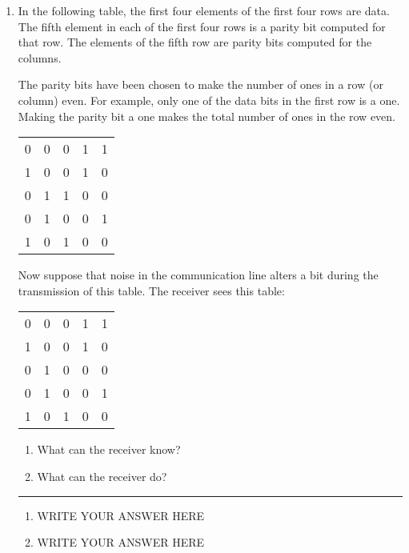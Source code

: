 \documentclass[twoside]{article}
\newenvironment{answer}
  {\vspace*{0.2cm} \rule{12cm}{0.04cm} \vspace*{0.2cm}}
  {\vspace*{0.2cm}}
\begin{document}
\begin{enumerate}
\begin{answer}
    \end{answer}

  \item In the following table, the first four elements of the
    first four rows are data. The fifth element in each of the 
    first four rows is a parity bit computed for that row.
    The elements of the fifth row are parity bits computed
    for the columns.

    The parity bits have been chosen to make the number of
    ones in a row (or column) even.
    For example, only one of the data bits in the first row
    is a one. Making the parity bit a one makes the total
    number of ones in the row even.

  \begin{tabular}{llll|l}
    0 & 0 & 0 & 1 & 1 \\
    1 & 0 & 0 & 1 & 0 \\
    0 & 1 & 1 & 0 & 0 \\
    0 & 1 & 0 & 0 & 1 \\ \hline
    1 & 0 & 1 & 0 & 0
    \end{tabular}

    Now suppose that noise in the communication line
    alters a bit during the transmission of this table.
    The receiver sees this table:

  \begin{tabular}{llll|l}
    0 & 0 & 0 & 1 & 1 \\
    1 & 0 & 0 & 1 & 0 \\
    0 & 1 & 0 & 0 & 0 \\
    0 & 1 & 0 & 0 & 1 \\ \hline
    1 & 0 & 1 & 0 & 0
    \end{tabular}

    \begin{enumerate}
      \item What can the receiver know?
      \item What can the receiver do?
      \end{enumerate}

  \begin{answer}

  \begin{enumerate}
    \item WRITE YOUR ANSWER HERE
    \item WRITE YOUR ANSWER HERE
    \end{enumerate}

    \end{answer}


\end{enumerate}
\end{document}
